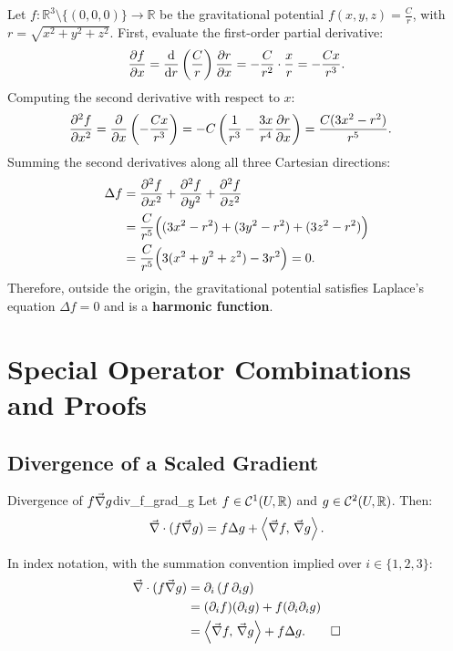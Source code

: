\begin{exemple}
Let $f : \mathbb{R}^3 \setminus \{(0,0,0)\} \to \mathbb{R}$ be the gravitational potential $f(x, y, z) = \frac{C}{r}$, with $r = \sqrt{x^2 + y^2 + z^2}$. First, evaluate the first-order partial derivative:
\begin{equation}
    \pdv{f}{x} = \frac{\dd}{\dd r}\left(\frac{C}{r}\right) \pdv{r}{x} = -\frac{C}{r^2} \cdot \frac{x}{r} = -\frac{C x}{r^3}.
\end{equation}
Computing the second derivative with respect to $x$:
\begin{align}
    \pdv[2]{f}{x} &= \pdv{}{x}\left(-\frac{C x}{r^3}\right) = -C \left( \frac{1}{r^3} - \frac{3x}{r^4} \pdv{r}{x} \right) = \frac{C(3x^2 - r^2)}{r^5}.
\end{align}
Summing the second derivatives along all three Cartesian directions:
\begin{align}
    \Delta f &= \pdv[2]{f}{x} + \pdv[2]{f}{y} + \pdv[2]{f}{z} \nonumber \\
    &= \frac{C}{r^5} \Big( (3x^2 - r^2) + (3y^2 - r^2) + (3z^2 - r^2) \Big) \nonumber \\
    &= \frac{C}{r^5} \Big( 3(x^2 + y^2 + z^2) - 3r^2 \Big) = 0.
\end{align}
Therefore, outside the origin, the gravitational potential satisfies Laplace's equation $\Delta f = 0$ and is a \textbf{harmonic function}.
\end{exemple}

\section{Special Operator Combinations and Proofs}

\subsection{Divergence of a Scaled Gradient}
\begin{proposition}{Divergence of $f \vec{\nabla} g$}{div_f_grad_g}
Let $f \in \mathcal{C}^1(U, \mathbb{R})$ and $g \in \mathcal{C}^2(U, \mathbb{R})$. Then:
\begin{equation}
    \vec{\nabla}\cdot (f \vec{\nabla} g) = f \Delta g + \left\langle \vec{\nabla} f, \, \vec{\nabla} g \right\rangle.
\end{equation}
\end{proposition}

\begin{demonstration}
In index notation, with the summation convention implied over $i \in \{1, 2, 3\}$:
\begin{align*}
    \vec{\nabla}\cdot (f \vec{\nabla} g) &= \partial_i \left( f \, \partial_i g \right) \\
    &= (\partial_i f)(\partial_i g) + f (\partial_i \partial_i g) \\
    &= \left\langle \vec{\nabla} f, \, \vec{\nabla} g \right\rangle + f \Delta g. \qedhere
\end{align*}
\end{demonstration}

